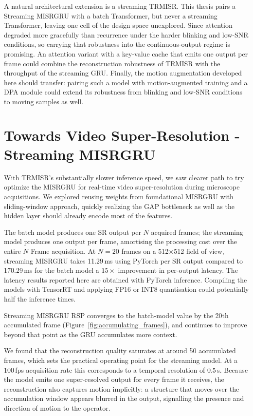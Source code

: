 A natural architectural extension is a streaming TRMISR. This thesis pairs a Streaming MISRGRU
with a batch Transformer, but never a streaming Transformer, leaving one cell of the design
space unexplored. Since attention degraded more gracefully than recurrence under the harder
blinking and low-SNR conditions, so carrying that robustness into the continuous-output regime is promising.
An attention variant with a key-value cache that
emits one output per frame could combine the reconstruction robustness of TRMISR with the
throughput of the streaming GRU. 
Finally, the motion augmentation developed here should transfer: 
pairing such a model with motion-augmented training and a
DPA module could extend its robustness from blinking and low-SNR conditions to
moving samples as well.

\section{Towards Video Super-Resolution - Streaming MISRGRU}                                
With TRMISR's substantially slower inference speed,
we saw clearer path to try optimize the MISRGRU for real-time video super-resolution 
during microscope acquisitions.
We explored reusing weights from foundational MISRGRU with sliding-window approach, quickly realizing the 
GAP bottleneck as well as the hidden layer should already encode most of the features.

The batch model produces one SR output per $N$ acquired frames; the streaming model
produces one output per frame, amortising the processing cost over the entire $N$ Frame 
acquisition.
At $N{=}20$ frames on a 512$\times$512 field of view, streaming MISRGRU takes 11.29\,ms using PyTorch
per SR output compared to 170.29\,ms for the batch model a $15\times$ improvement in
per-output latency.
The latency results reported here are obtained with PyTorch inference. Compiling the models
with TensorRT and applying FP16 or INT8 quantisation could potentially half the inference times.


Streaming MISRGRU RSP converges to the batch-model value by the 20th accumulated frame
(Figure~\ref{fig:accumulating_frames}), and continues to improve beyond that     
point as the GRU accumulates more context. 

We found that the reconstruction quality saturates at around 50 accumulated frames, which sets
the practical operating point for the streaming model. At a 100\,fps acquisition rate this
corresponds to a temporal resolution of 0.5\,s. Because the model emits one super-resolved
output for every frame it receives, the reconstruction also captures motion implicitly: a
structure that moves over the accumulation window appears blurred in the output, signalling
the presence and direction of motion to the operator.

